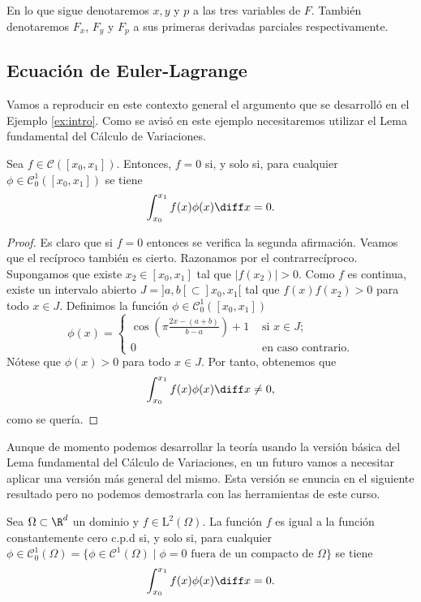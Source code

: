 \documentclass{article}
\begin{document}
En lo que sigue denotaremos $x,y$ y $p$ a las tres variables de $F$. También denotaremos $F_x$,
$F_y$ y $F_p$ a sus primeras derivadas parciales respectivamente.

\subsection{Ecuación de Euler-Lagrange}

Vamos a reproducir en este contexto general el argumento que se desarrolló en el Ejemplo
\ref{ex:intro}. Como se avisó en este ejemplo necesitaremos utilizar el Lema fundamental del Cálculo
de Variaciones.

\begin{thm}
  Sea $f \in \mathcal{C}([x_0, x_1])$. Entonces, $f = 0$ si, y solo si, para cualquier
  $\phi \in \mathcal{C}^1_0([x_0, x_1])$ se tiene
  \[\int_{x_0}^{x_1} f(x) \phi(x) \diff x = 0.\]
\end{thm}
\begin{proof}
  Es claro que si $f = 0$ entonces se verifica la segunda afirmación. Veamos que el recíproco
  también es cierto. Razonamos por el contrarrecíproco. Supongamos que existe $x_2 \in [x_0, x_1]$
  tal que $|f(x_2)| > 0$. Como $f$ es continua, existe un intervalo abierto
  $J = ]a,b[ \subset ]x_0, x_1[$ tal que $f(x)f(x_2) > 0$ para todo $x \in J$. Definimos la función
  $\phi \in \mathcal{C}^1_0([x_0, x_1])$
  \[ \phi(x) = \begin{cases} \cos\left(\pi\frac{2x-(a+b)}{b-a}\right) + 1 & \text{ si } x \in J; \\
      0 & \text{ en caso contrario}.\end{cases}\] Nótese que $\phi(x) > 0$ para todo $x \in J$. Por
  tanto, obtenemos que
  \[\int_{x_0}^{x_1} f(x) \phi(x) \diff x \ne 0,\]
  como se quería.
\end{proof}

Aunque de momento podemos desarrollar la teoría usando la versión básica del Lema fundamental del
Cálculo de Variaciones, en un futuro vamos a necesitar aplicar una versión más general del
mismo. Esta versión se enuncia en el siguiente resultado pero no podemos demostrarla con las
herramientas de este curso.

\begin{theorem}
  \label{thm:fundamental-variaciones}
  Sea $\Omega \subset \R^d$ un dominio y $f \in \mathrm{L}^2(\Omega)$. La función $f$ es igual a la
  función constantemente cero c.p.d si, y solo si, para cualquier
  $\phi \in \mathcal{C}^1_0(\Omega) = \{ \phi \in \mathcal{C}^1(\Omega) \mid \phi = 0 \text{ fuera
    de un compacto de }\Omega\}$ se tiene
  \[\int_{x_0}^{x_1} f(x) \phi(x) \diff x = 0.\]
\end{theorem}
\end{document}
